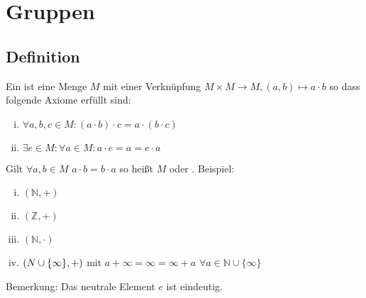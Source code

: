 
\newcommand{\fach}{Einführung in die Algebra}
\newcommand{\semester}{WiSe 2013}
\newcommand{\homepage}{http://wwwmath.uni-muenster.de/reine/u/topos/lehre/WS2013-2014/Algebra/algebra.html}
\newcommand{\prof}{Prof.\,Dr.\,Arthur Bartels}



\maketitle
\begin{abstract}

\end{abstract}

\setcounter{page}{1}
\tableofcontents
\cleardoubleoddemptypage
{}
\setcounter{page}{1}



\section{Gruppen} %
\label{sec:1}

\subsection[Definition: Monoid]{Definition} %
\label{sub:11}
Ein  ist eine Menge $M$ mit einer Verknüpfung $M \times M \to M, (a,b) \mapsto a \cdot b$ so dass folgende Axiome erfüllt sind:
\begin{enumerate}[(i)]
	\item $\forall a,b,c \in M : (a \cdot b )\cdot c = a \cdot (b \cdot c)$
	\item $\exists e \in M : \forall a \in M : a \cdot e = a = e \cdot a$
\end{enumerate} 
Gilt $\forall a,b \in M$ $a \cdot b = b \cdot a$ so heißt $M$  oder . Beispiel: 
\begin{multicols}{2}
	\begin{enumerate}[(i)]
		\item $(\mathds{N},+)$
		\item $(\mathds{Z},+)$
		\item $(\mathds{N}, \cdot )$
		\item $(N \cup \{ \infty\}, +) $ mit $a + \infty = \infty = \infty + a$ $\forall a \in \mathds{N} \cup \{ \infty \}$
	\end{enumerate}
\end{multicols}
Bemerkung: Das neutrale Element $e$ ist eindeutig.

